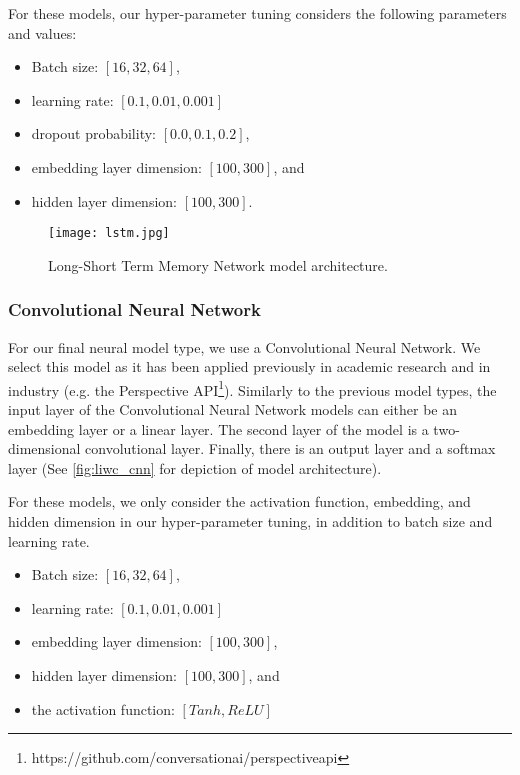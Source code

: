 For these models, our hyper-parameter tuning considers the following parameters and values:

\begin{itemize}
  \item Batch size: $[16, 32, 64]$,
  \item learning rate: $[0.1, 0.01, 0.001]$
  \item dropout probability: $[0.0, 0.1, 0.2]$,
  \item embedding layer dimension: $[100, 300]$, and
  \item hidden layer dimension: $[100, 300]$.
\end{itemize}

\begin{figure}
  \centering
  \texttt{[image: lstm.jpg]}
  \caption{Long-Short Term Memory Network model architecture.}
  \label{fig:liwc_lstm}
\end{figure}

\subsubsection{Convolutional Neural Network}

For our final neural model type, we use a Convolutional Neural Network. We select this model as it has been applied previously in academic research \cite{CITE: CNN papers} and in industry (e.g. the Perspective API\footnote{https://github.com/conversationai/perspectiveapi}). Similarly to the previous model types, the input layer of the Convolutional Neural Network models can either be an embedding layer or a linear layer. The second layer of the model is a two-dimensional convolutional layer. Finally, there is an output layer and a softmax layer (See \autoref{fig:liwc_cnn} for depiction of model architecture).

For these models, we only consider the activation function, embedding, and hidden dimension in our hyper-parameter tuning, in addition to batch size and learning rate.

\begin{itemize}
  \item Batch size: $[16, 32, 64]$,
  \item learning rate: $[0.1, 0.01, 0.001]$
  \item embedding layer dimension: $[100, 300]$,
  \item hidden layer dimension: $[100, 300]$, and
  \item the activation function: $[Tanh, ReLU]$
\end{itemize}

